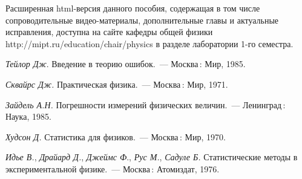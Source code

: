\documentclass[a5paper,10pt,oneside]{report}
\begin{document}
    Расширенная html-версия данного пособия, содержащая в том числе 
    сопроводительные видео-материалы, дополнительные главы и
    актуальные исправления, доступна на сайте кафедры общей физики http://mipt.ru/education/chair/physics в разделе
    лаборатории 1-го семестра.









% 

%

\begin{thebibliography}{1}

 \textit{Тейлор Дж}. Введение в теорию ошибок.~---
    Москва\,: Мир, 1985.

 \textit{Сквайрс Дж.} Практическая физика.~--- Москва\,: Мир, 1971.

 \textit{Зайдель А.Н.} 
Погрешности измерений физических величин.~--- Ленинград\,: Наука, 1985.


 \textit{Худсон Д.} Статистика для физиков.~---
    Москва\,: Мир, 1970.

 \textit{Идье В.}, \textit{Драйард Д.}, \textit{Джеймс Ф}., \textit{Рус М.}, \textit{Садуле Б.} Статистические методы в экспериментальной физике.~--- Москва\,: Атомиздат, 1976. 


\end{thebibliography}
\end{document}
